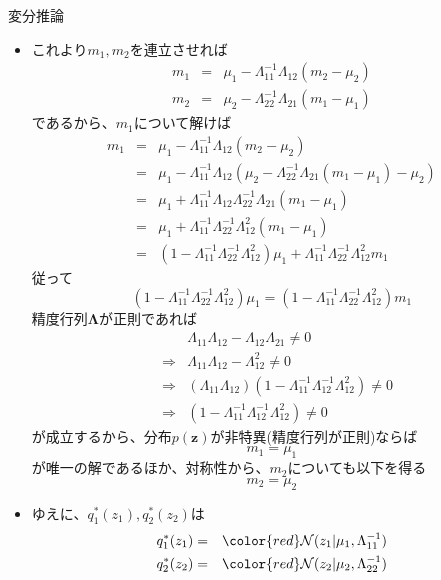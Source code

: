 \documentclass[dvipdfmx,notheorems,t]{beamer}
\begin{document}
\begin{frame}{変分推論}
\begin{itemize}
\begin{itemize}
		\item これより$m_1, m_2$を連立させれば
		\begin{eqnarray}
			m_1 &=& \mu_1 - \Lambda_{11}^{-1} \Lambda_{12} (m_2 - \mu_2) \\
			m_2 &=& \mu_2 - \Lambda_{22}^{-1} \Lambda_{21} (m_1 - \mu_1)
		\end{eqnarray}
		であるから、$m_1$について解けば
		\begin{eqnarray}
			m_1 &=& \mu_1 - \Lambda_{11}^{-1} \Lambda_{12} (m_2 - \mu_2) \\
			&=& \mu_1 - \Lambda_{11}^{-1} \Lambda_{12} \left( \mu_2 - \Lambda_{22}^{-1} \Lambda_{21} (m_1 - \mu_1) - \mu_2 \right) \\
			&=& \mu_1 + \Lambda_{11}^{-1} \Lambda_{12} \Lambda_{22}^{-1} \Lambda_{21} (m_1 - \mu_1) \\
			&=& \mu_1 + \Lambda_{11}^{-1} \Lambda_{22}^{-1} \Lambda_{12}^2 (m_1 - \mu_1) \\
			&=& \left( 1 - \Lambda_{11}^{-1} \Lambda_{22}^{-1} \Lambda_{12}^2 \right) \mu_1 + \Lambda_{11}^{-1} \Lambda_{22}^{-1} \Lambda_{12}^2 m_1
		\end{eqnarray}
		従って
		\begin{equation}
			\left( 1 - \Lambda_{11}^{-1} \Lambda_{22}^{-1} \Lambda_{12}^2 \right) \mu_1 = \left( 1 - \Lambda_{11}^{-1} \Lambda_{22}^{-1} \Lambda_{12}^2 \right) m_1
		\end{equation}
		精度行列$\bm{\Lambda}$が正則であれば
		\begin{eqnarray}
			&& \Lambda_{11} \Lambda_{12} - \Lambda_{12} \Lambda_{21} \neq 0 \\
			&\Rightarrow& \Lambda_{11} \Lambda_{12} - \Lambda_{12}^2 \neq 0 \\
			&\Rightarrow& \left( \Lambda_{11} \Lambda_{12} \right) \left( 1 - \Lambda_{11}^{-1} \Lambda_{12}^{-1} \Lambda_{12}^2 \right) \neq 0 \\
			&\Rightarrow& \left( 1 - \Lambda_{11}^{-1} \Lambda_{12}^{-1} \Lambda_{12}^2 \right) \neq 0
		\end{eqnarray}
		が成立するから、分布$p(\bm{z})$が非特異(精度行列が正則)ならば
		\begin{equation}
			m_1 = \mu_1
		\end{equation}
		が唯一の解であるほか、対称性から、$m_2$についても以下を得る
		\begin{equation}
			m_2 = \mu_2
		\end{equation}
		
		\item ゆえに、$q_1^*(z_1), q_2^*(z_2)$は
		\begin{eqnarray}
			q_1^*(z_1) &=& \color{red}\mathcal{N}(z_1 | \mu_1, \Lambda_{11}^{-1})\normalcolor \\
			q_2^*(z_2) &=& \color{red}\mathcal{N}(z_2 | \mu_2, \Lambda_{22}^{-1})\normalcolor
		\end{eqnarray}
	\end{itemize} \
	

\end{itemize}
\end{frame}
\end{document}
